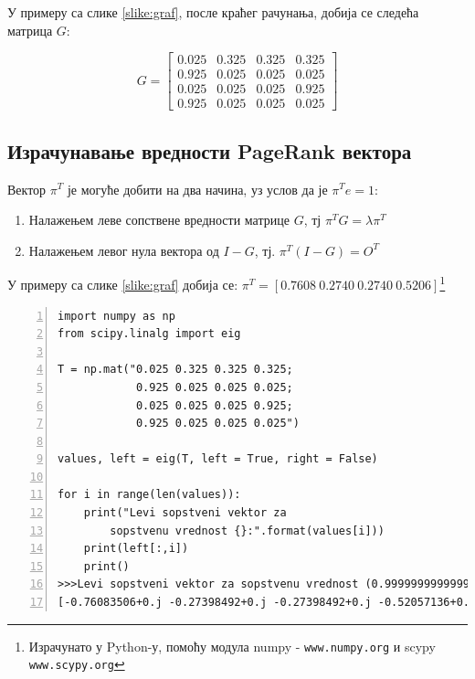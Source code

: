 У примеру са слике \ref{slike:graf}, после краћег рачунања, добија се следећа матрица $G$:

\[G =
\begin{bmatrix}
0.025 & 0.325 & 0.325 & 0.325 \\
0.925 & 0.025 & 0.025 & 0.025 \\
0.025 & 0.025 & 0.025 & 0.925 \\
0.925 & 0.025 & 0.025 & 0.025
\end{bmatrix}
\]

\subsection{Израчунавање вредности PageRank\texttrademark{} вектора}

Вектор $\pi^{T}$ је могуће добити на два начина, уз услов да је $\pi^{T}e = 1$:

\begin{enumerate}
\item Налажењем леве сопствене вредности матрице $G$, тј $\pi^{T}G=\lambda \pi^{T}$
\item Налажењем левог нула вектора од $I - G$, тј. $\pi^{T}(I-G)=O^{T}$
\end{enumerate}

У примеру са слике \ref{slike:graf} добија се: $\pi^{T} = \left [0.7608\: 0.2740\: 0.2740\: 0.5206 \right ]$\footnote{Израчунато у Python-у, помоћу модула numpy - \texttt{www.numpy.org} и scypy \texttt{www.scypy.org}}

\begin{lstlisting}[caption=Израчунавање леве сопствене вредности, label={lst:eigen}, numbers=left]
import numpy as np
from scipy.linalg import eig

T = np.mat("0.025 0.325 0.325 0.325;
            0.925 0.025 0.025 0.025;
            0.025 0.025 0.025 0.925;
            0.925 0.025 0.025 0.025")

values, left = eig(T, left = True, right = False)

for i in range(len(values)):
	print("Levi sopstveni vektor za
        sopstvenu vrednost {}:".format(values[i]))
	print(left[:,i])
	print()
>>>Levi sopstveni vektor za sopstvenu vrednost (0.9999999999999998+0j):
[-0.76083506+0.j -0.27398492+0.j -0.27398492+0.j -0.52057136+0.j]
\end{lstlisting}

